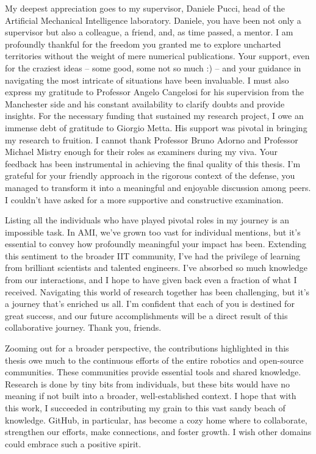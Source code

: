 \begin{addmargin}{-1.0cm}
My deepest appreciation goes to my supervisor, Daniele Pucci, head of the Artificial Mechanical Intelligence laboratory.
Daniele, you have been not only a supervisor but also a colleague, a friend, and, as time passed, a mentor.
I am profoundly thankful for the freedom you granted me to explore uncharted territories without the weight of mere numerical publications.
Your support, even for the craziest ideas -- some good, some not so much :) -- and your guidance in navigating the most intricate of situations have been invaluable. \linebreak
I must also express my gratitude to Professor Angelo Cangelosi for his supervision from the Manchester side and his constant availability to clarify doubts and provide insights.
For the necessary funding that sustained my research project, I owe an immense debt of gratitude to Giorgio Metta.
His support was pivotal in bringing my research to fruition.
I cannot thank Professor Bruno Adorno and Professor Michael Mistry enough for their roles as examiners during my viva.
Your feedback has been instrumental in achieving the final quality of this thesis.
I'm grateful for your friendly approach in the rigorous context of the defense, you managed to transform it into a meaningful and enjoyable discussion among peers.
I couldn't have asked for a more supportive and constructive examination.

Listing all the individuals who have played pivotal roles in my journey is an impossible task.
In AMI, we've grown too vast for individual mentions, but it's essential to convey how profoundly meaningful your impact has been.
Extending this sentiment to the broader IIT community, I've had the privilege of learning from brilliant scientists and talented engineers.
I've absorbed so much knowledge from our interactions, and I hope to have given back even a fraction of what I received.
Navigating this world of research together has been challenging, but it's a journey that's enriched us all.
I'm confident that each of you is destined for great success, and our future accomplishments will be a direct result of this collaborative journey.
Thank you, friends.

Zooming out for a broader perspective, the contributions highlighted in this thesis owe much to the continuous efforts of the entire robotics and open-source communities. \linebreak
These communities provide essential tools and shared knowledge.
Research is done by tiny bits from individuals, but these bits would have no meaning if not built into a broader, well-established context.
I hope that with this work, I succeeded in contributing my grain to this vast sandy beach of knowledge.
GitHub, in particular, has become a cozy home where to collaborate, strengthen our efforts, make connections, and foster growth.
I wish other domains could embrace such a positive spirit.


\end{addmargin}
